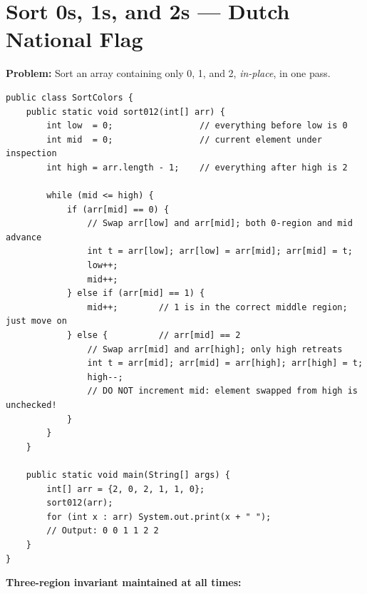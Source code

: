 \documentclass[12pt,a4paper,oneside]{book}
\begin{document}
\section{Sort 0s, 1s, and 2s --- Dutch National Flag}

\textbf{Problem:} Sort an array containing only 0, 1, and 2, \textit{in-place}, in one pass.

\begin{lstlisting}[caption={Dutch National Flag Algorithm --- O(n) time O(1) space}]
public class SortColors {
    public static void sort012(int[] arr) {
        int low  = 0;                 // everything before low is 0
        int mid  = 0;                 // current element under inspection
        int high = arr.length - 1;    // everything after high is 2

        while (mid <= high) {
            if (arr[mid] == 0) {
                // Swap arr[low] and arr[mid]; both 0-region and mid advance
                int t = arr[low]; arr[low] = arr[mid]; arr[mid] = t;
                low++;
                mid++;
            } else if (arr[mid] == 1) {
                mid++;        // 1 is in the correct middle region; just move on
            } else {          // arr[mid] == 2
                // Swap arr[mid] and arr[high]; only high retreats
                int t = arr[mid]; arr[mid] = arr[high]; arr[high] = t;
                high--;
                // DO NOT increment mid: element swapped from high is unchecked!
            }
        }
    }

    public static void main(String[] args) {
        int[] arr = {2, 0, 2, 1, 1, 0};
        sort012(arr);
        for (int x : arr) System.out.print(x + " ");
        // Output: 0 0 1 1 2 2
    }
}
\end{lstlisting}

\textbf{Three-region invariant maintained at all times:}

\begin{center}
\end{center}
\end{document}
